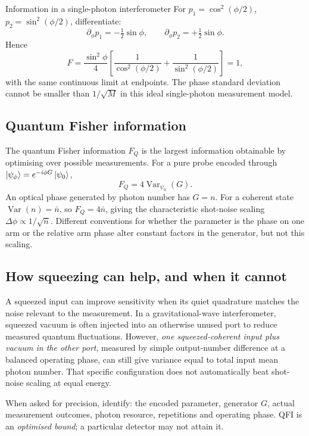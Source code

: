 \begin{worked}{Information in a single-photon interferometer}
For \(p_1=\cos^2(\phi/2)\),
\(p_2=\sin^2(\phi/2)\), differentiate:
\[
\partial_\phi p_1=-\tfrac12\sin\phi,\qquad
\partial_\phi p_2=+\tfrac12\sin\phi.
\]
Hence
\[
F=\frac{\sin^2\phi}{4}
\left[\frac1{\cos^2(\phi/2)}
+\frac1{\sin^2(\phi/2)}\right]
=\boxed{1},
\]
with the same continuous limit at endpoints.
The phase standard deviation cannot be
smaller than \(1/\sqrt M\) in this ideal
single-photon measurement model.
\end{worked}

\subsection{Quantum Fisher information}
The quantum Fisher information \(F_Q\)
is the largest information obtainable
by optimising over possible measurements.
For a pure probe encoded through
\(\left\lvert \psi_\phi\right\rangle=e^{-i\phi G}\left\lvert \psi_0\right\rangle\),
\[
\boxed{F_Q=4\operatorname{Var}_{\psi_0}(G).}
\]
An optical phase generated by photon number
has \(G=n\). For a coherent state
\(\operatorname{Var}(n)=\bar n\), so
\(F_Q=4\bar n\), giving the characteristic
shot-noise scaling
\(\Delta\phi\propto1/\sqrt{\bar n}\).
Different conventions for whether the
parameter is the phase on one arm or the
relative arm phase alter constant factors
in the generator, but not this scaling.

\subsection{How squeezing can help, and when it cannot}
A squeezed input can improve sensitivity
when its quiet quadrature matches the
noise relevant to the measurement.
In a gravitational-wave interferometer,
squeezed vacuum is often injected into
an otherwise unused port to reduce
measured quantum fluctuations.
However, \emph{one squeezed-coherent input
plus vacuum in the other port}, measured
by simple output-number difference at
a balanced operating phase, can still
give variance equal to total input
mean photon number. That specific
configuration does not automatically
beat shot-noise scaling at equal energy.

\begin{checkpoint}
When asked for precision, identify:
the encoded parameter, generator \(G\),
actual measurement outcomes, photon
resource, repetitions and operating
phase. QFI is an \emph{optimised bound};
a particular detector may not attain it.
\end{checkpoint}
